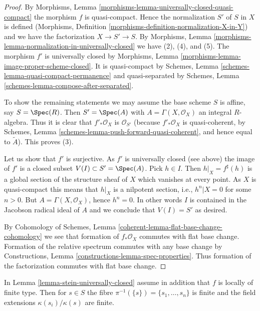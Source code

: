 \begin{proof}
By Morphisms, Lemma \ref{morphisms-lemma-universally-closed-quasi-compact}
the morphism $f$ is quasi-compact. Hence the normalization $S'$ of $S$ in
$X$ is defined (Morphisms, Definition
\ref{morphisms-definition-normalization-X-in-Y})
and we have the factorization $X \to S' \to S$. By
Morphisms, Lemma \ref{morphisms-lemma-normalization-in-universally-closed}
we have (2), (4), and (5). The morphism $f'$ is universally closed by
Morphisms, Lemma \ref{morphisms-lemma-image-proper-scheme-closed}.
It is quasi-compact by
Schemes, Lemma \ref{schemes-lemma-quasi-compact-permanence}
and quasi-separated by
Schemes, Lemma \ref{schemes-lemma-compose-after-separated}.

\medskip\noindent
To show the remaining statements we may assume the base scheme $S$ is affine,
say $S = \Spec(R)$. Then $S' = \Spec(A)$ with
$A = \Gamma(X, \mathcal{O}_X)$ an integral $R$-algebra.
Thus it is clear that $f'_*\mathcal{O}_X$
is $\mathcal{O}_{S'}$ (because $f'_*\mathcal{O}_X$ is quasi-coherent,
by
Schemes, Lemma
\ref{schemes-lemma-push-forward-quasi-coherent},
and hence equal to $\widetilde{A}$). This proves (3).

\medskip\noindent
Let us show that $f'$ is surjective. As $f'$ is universally closed (see above)
the image of $f'$ is a closed subset
$V(I) \subset S' = \Spec(A)$. Pick $h \in I$. Then
$h|_X = f^\sharp(h)$ is a global section of the structure sheaf of
$X$ which vanishes at every point. As $X$ is quasi-compact this means
that $h|_X$ is a nilpotent section, i.e., $h^n|X = 0$ for some $n > 0$.
But $A = \Gamma(X, \mathcal{O}_X)$, hence $h^n = 0$.
In other words $I$ is contained in the Jacobson radical ideal of $A$
and we conclude that $V(I) = S'$ as desired.

\medskip\noindent
By Cohomology of Schemes, Lemma \ref{coherent-lemma-flat-base-change-cohomology}
we see that formation of $f_*\mathcal{O}_X$ commutes with flat base change.
Formation of the relative spectrum commutes with any base change by
Constructions, Lemma \ref{constructions-lemma-spec-properties}.
Thus formation of the factorization commutes with flat base change.
\end{proof}

\begin{lemma}
\label{lemma-stein-universally-closed-residue-fields}
In Lemma \ref{lemma-stein-universally-closed} assume in addition that
$f$ is locally of finite type. Then for $s \in S$ the fibre
$\pi^{-1}(\{s\}) = \{s_1, \ldots, s_n\}$ is finite and the field extensions
$\kappa(s_i)/\kappa(s)$ are finite.
\end{lemma}


